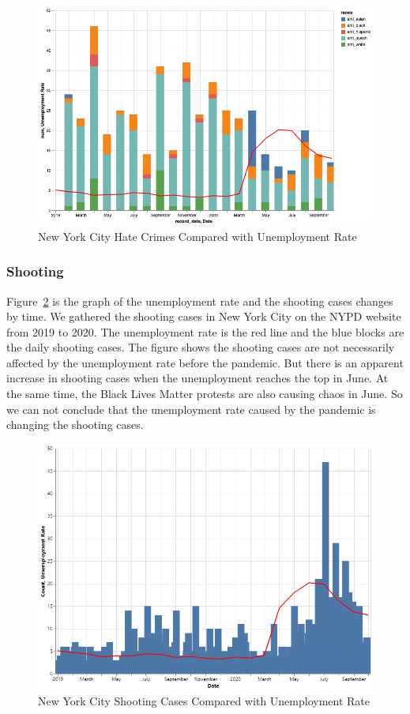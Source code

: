 \documentclass[conference]{IEEEtran}
\begin{document}
\begin{figure}[ht!]
    \centering
    \includegraphics[width=\linewidth]{images/hate_crime.png}
    \caption{New York City Hate Crimes Compared with Unemployment Rate}
    \label{fig:hate_crime}
\end{figure}

\subsubsection{Shooting}
Figure~\ref{fig:Shooting&UER} is the graph of the unemployment rate and the shooting cases changes by time. We gathered the shooting cases in New York City on the NYPD website from 2019 to 2020. The unemployment rate is the red line and the blue blocks are the daily shooting cases. The figure shows the shooting cases are not necessarily affected by the unemployment rate before the pandemic. But there is an apparent increase in shooting cases when the unemployment reaches the top in June. At the same time, the Black Lives Matter protests are also causing chaos in June. So we can not conclude that the unemployment rate caused by the pandemic is changing the shooting cases.



\begin{figure}[ht!]
    \centering
    \includegraphics[width=\linewidth]{images/Shooting&UER.png}
    \caption{New York City Shooting Cases Compared with Unemployment Rate}
    \label{fig:Shooting&UER}
\end{figure}
\end{document}
